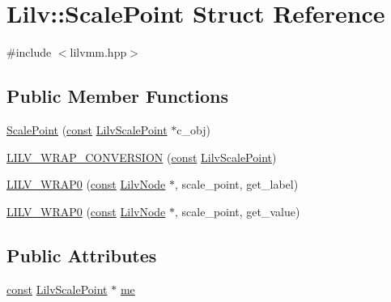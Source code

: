 \hypertarget{struct_lilv_1_1_scale_point}{}\section{Lilv\+:\+:Scale\+Point Struct Reference}
\label{struct_lilv_1_1_scale_point}


{\ttfamily \#include $<$lilvmm.\+hpp$>$}

\subsection*{Public Member Functions}
\begin{DoxyCompactItemize}
\item 
\hyperlink{struct_lilv_1_1_scale_point_a9d5c236319cf6d226df8755451c127af}{Scale\+Point} (\hyperlink{getopt1_8c_a2c212835823e3c54a8ab6d95c652660e}{const} \hyperlink{lilv_8h_a582b8861d7e51d38ff769281ef4ae518}{Lilv\+Scale\+Point} $\ast$c\+\_\+obj)
\item 
\hyperlink{struct_lilv_1_1_scale_point_a6fd9588ab0ab337f6fa62e4c92e417be}{L\+I\+L\+V\+\_\+\+W\+R\+A\+P\+\_\+\+C\+O\+N\+V\+E\+R\+S\+I\+ON} (\hyperlink{getopt1_8c_a2c212835823e3c54a8ab6d95c652660e}{const} \hyperlink{lilv_8h_a582b8861d7e51d38ff769281ef4ae518}{Lilv\+Scale\+Point})
\item 
\hyperlink{struct_lilv_1_1_scale_point_ad521d67f7504af306f0f83b211e32703}{L\+I\+L\+V\+\_\+\+W\+R\+A\+P0} (\hyperlink{getopt1_8c_a2c212835823e3c54a8ab6d95c652660e}{const} \hyperlink{lilv_8h_ae183dca3dca5368d34dbd863a405437b}{Lilv\+Node} $\ast$, scale\+\_\+point, get\+\_\+label)
\item 
\hyperlink{struct_lilv_1_1_scale_point_a5a055e53f48c3547ea527e425a6eb131}{L\+I\+L\+V\+\_\+\+W\+R\+A\+P0} (\hyperlink{getopt1_8c_a2c212835823e3c54a8ab6d95c652660e}{const} \hyperlink{lilv_8h_ae183dca3dca5368d34dbd863a405437b}{Lilv\+Node} $\ast$, scale\+\_\+point, get\+\_\+value)
\end{DoxyCompactItemize}
\subsection*{Public Attributes}
\begin{DoxyCompactItemize}
\item 
\hyperlink{getopt1_8c_a2c212835823e3c54a8ab6d95c652660e}{const} \hyperlink{lilv_8h_a582b8861d7e51d38ff769281ef4ae518}{Lilv\+Scale\+Point} $\ast$ \hyperlink{struct_lilv_1_1_scale_point_a7c9b33ca04457083e78ed53f89596c8e}{me}
\end{DoxyCompactItemize}


